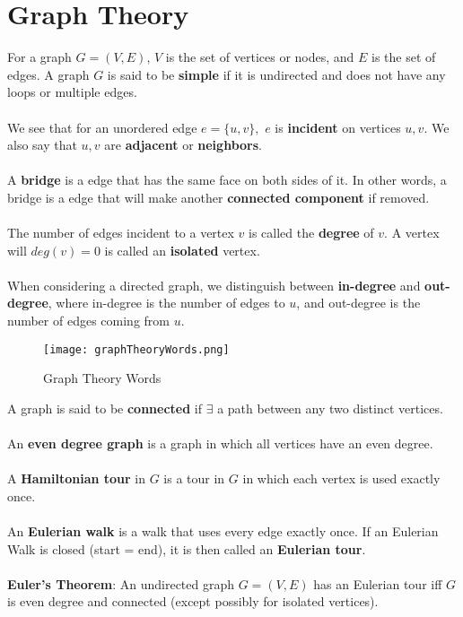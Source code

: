 \documentclass{article}
\theoremstyle{definition}
\begin{document}
\section*{Graph Theory}
For a graph $G = (V, E)$, $V$ is the set of vertices or nodes, and $E$ is the set of edges. A graph $G$ is said to be \textbf{simple} if it is undirected and does not have any loops or multiple edges. \\ \\
We see that for an unordered edge $e = \{u, v\},$ $e$ is \textbf{incident} on vertices $u, v.$ We also say that $u, v$ are \textbf{adjacent} or \textbf{neighbors}. \\ \\
A \textbf{bridge} is a edge that has the same face on both sides of it. In other words, a bridge is a edge that will make another \textbf{connected component} if removed. \\ \\
The number of edges incident to a vertex $v$ is called the \textbf{degree} of $v$. A vertex will $deg(v) = 0$ is called an \textbf{isolated} vertex. \\ \\
When considering a directed graph, we distinguish between \textbf{in-degree} and \textbf{out-degree}, where in-degree is the number of edges to $u$, and out-degree is the number of edges coming from $u$. \\
\begin{figure}[H]
\begin{center}
\texttt{[image: graphTheoryWords.png]}
\caption{Graph Theory Words}
\end{center}
\end{figure}
\noindent A graph is said to be \textbf{connected} if $\exists$ a path between any two distinct vertices. \\ \\
An \textbf{even degree graph} is a graph in which all vertices have an even degree. \\ \\
A \textbf{Hamiltonian tour} in $G$ is a tour in $G$ in which each vertex is used exactly once. \\ \\
An \textbf{Eulerian walk} is a walk that uses every edge exactly once. If an Eulerian Walk is closed (start = end), it is then called an \textbf{Eulerian tour}. \\ \\
\textbf{Euler's Theorem}: An undirected graph $G = (V, E)$ has an Eulerian tour iff $G$ is even degree and connected (except possibly for isolated vertices). \\ \\
\end{document}
